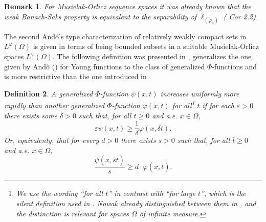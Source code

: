 \documentclass[11pt,a4paper]{amsart}
\newtheorem{definicion}{Definition}[section]
\newtheorem{nota}[definicion]{Remark}
\newcommand{\lphi}{{L^{\varphi}(\Omega)}}
\newcommand\boldred[1]{\textcolor{red}{\textbf{#1}}}
\begin{document}
\begin{nota}\label{Nakano-wBS}
    For Musielak-Orlicz sequence spaces it was already known that the weak Banach-Saks property is equivalent to the separability of $\ell_{(\varphi_n)}$ (\cite{Kaminska-Lee} Cor 2.2).
\end{nota}




The second And\^o's type characterization of relatively weakly compact sets in $\lphi$ is given in terms of being bounded subsets in a suitable Musielak-Orlicz spaces $L^{\psi}(\Omega)$.
The following definition was presented in \cite{PCM3}, generalizes the one given by And\^{o} (\cite{Ando}) for Young functions to the class of generalized $\Phi$-functions and is more restrictive than the one introduced in \cite{PCM}.

\begin{definicion}
A generalized $\Phi$-function $\psi(x,t)$ increases uniformly more rapidly than another generalized $\Phi$-function $\varphi(x,t)$ for all\footnote{We use the wording ``for all $t$'' in contrast with ``for large $t$'', which is the silent definition used in \cite{Ando}. Nowak already distinguished between them in \cite{Nowak}, and the distinction is relevant for spaces $\Omega$ of infinite measure.} $t$ if for each $\varepsilon>0$ there exists some $\delta>0$ such that, for all $t\geq 0$ and a.e. $x\in \Omega$,
$$
\varepsilon\psi(x,t) \geq  \frac{1}{\delta}\varphi(x,\delta t).
$$
Or, equivalenty, that for every $d>0$ there exists $s>0$ such that, for all $\overline{t}\geq 0$ and a.e. $x\in\Omega$,
$$
\frac{\psi(x,s \overline{t})}{s}\geq d\cdot\varphi(x,\overline{t}).
$$
\end{definicion}

\end{document}
